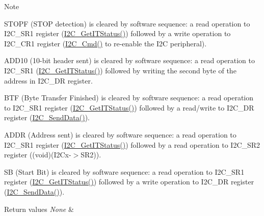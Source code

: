 \begin{DoxyNote}{Note}

\begin{DoxyItemize}
\item S\+T\+O\+PF (S\+T\+OP detection) is cleared by software sequence\+: a read operation to I2\+C\+\_\+\+S\+R1 register (\hyperlink{group___i2_c___private___functions_ga447771fbbd94a56f3570b9f430a069ba}{I2\+C\+\_\+\+Get\+I\+T\+Status()}) followed by a write operation to I2\+C\+\_\+\+C\+R1 register (\hyperlink{group___i2_c___private___functions_ga7e1323c9133c2cb424dfb5b10b7d2f0b}{I2\+C\+\_\+\+Cmd()} to re-\/enable the I2C peripheral).
\item A\+D\+D10 (10-\/bit header sent) is cleared by software sequence\+: a read operation to I2\+C\+\_\+\+S\+R1 (\hyperlink{group___i2_c___private___functions_ga447771fbbd94a56f3570b9f430a069ba}{I2\+C\+\_\+\+Get\+I\+T\+Status()}) followed by writing the second byte of the address in I2\+C\+\_\+\+DR register.
\item B\+TF (Byte Transfer Finished) is cleared by software sequence\+: a read operation to I2\+C\+\_\+\+S\+R1 register (\hyperlink{group___i2_c___private___functions_ga447771fbbd94a56f3570b9f430a069ba}{I2\+C\+\_\+\+Get\+I\+T\+Status()}) followed by a read/write to I2\+C\+\_\+\+DR register (\hyperlink{group___i2_c___private___functions_ga7bd9e70b8eafde0dd5eb42b0d95fe1a9}{I2\+C\+\_\+\+Send\+Data()}).
\item A\+D\+DR (Address sent) is cleared by software sequence\+: a read operation to I2\+C\+\_\+\+S\+R1 register (\hyperlink{group___i2_c___private___functions_ga447771fbbd94a56f3570b9f430a069ba}{I2\+C\+\_\+\+Get\+I\+T\+Status()}) followed by a read operation to I2\+C\+\_\+\+S\+R2 register ((void)(I2\+Cx-\/$>$S\+R2)).
\item SB (Start Bit) is cleared by software sequence\+: a read operation to I2\+C\+\_\+\+S\+R1 register (\hyperlink{group___i2_c___private___functions_ga447771fbbd94a56f3570b9f430a069ba}{I2\+C\+\_\+\+Get\+I\+T\+Status()}) followed by a write operation to I2\+C\+\_\+\+DR register (\hyperlink{group___i2_c___private___functions_ga7bd9e70b8eafde0dd5eb42b0d95fe1a9}{I2\+C\+\_\+\+Send\+Data()}). 
\end{DoxyItemize}
\end{DoxyNote}

\begin{DoxyRetVals}{Return values}
{\em None} & \\
\hline
\end{DoxyRetVals}


